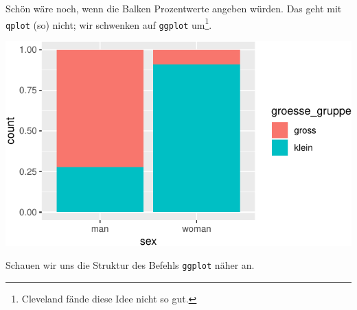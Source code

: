 \documentclass[12pt,ngerman,paper=a4,pagesize,DIV=13]{scrreprt}
\newenvironment{Shaded}{\begin{snugshade}}{\end{snugshade}}
\newcommand{\DataTypeTok}[1]{\textcolor[rgb]{0.13,0.29,0.53}{#1}}
\newcommand{\KeywordTok}[1]{\textcolor[rgb]{0.13,0.29,0.53}{\textbf{#1}}}
\newcommand{\NormalTok}[1]{#1}
\newcommand{\OperatorTok}[1]{\textcolor[rgb]{0.81,0.36,0.00}{\textbf{#1}}}
\newcommand{\StringTok}[1]{\textcolor[rgb]{0.31,0.60,0.02}{#1}}
\begin{document}
Schön wäre noch, wenn die Balken Prozentwerte angeben würden. Das geht
mit \texttt{qplot} (so) nicht; wir schwenken auf \texttt{ggplot}
um\footnote{Cleveland fände diese Idee nicht so gut.}.

\begin{Shaded}
\end{Shaded}

\includegraphics{DatenerhebungStatistik-Uebung_files/figure-latex/unnamed-chunk-253-1.pdf}

Schauen wir uns die Struktur des Befehls \texttt{ggplot} näher an.
\end{document}
